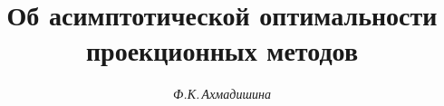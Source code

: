 




%


\newcommand{\im}{\operatorname{Im}}


\newcommand{\Ker}{\operatorname{Ker}}


\newcommand{\tts}[1]{}







\setcounter{page}{77}















\author{\it Ф.К.\,Ахмадишина}




\title{Об асимптотической оптимальности\\


проекционных методов}





\date{}




\pagestyle{plain} %







\maketitle


